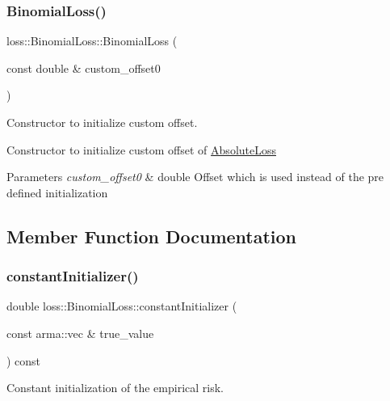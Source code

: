 \subsubsection{\texorpdfstring{Binomial\+Loss()}{BinomialLoss()}\hspace{0.1cm}{\footnotesize\ttfamily [2/2]}}
{\footnotesize\ttfamily loss\+::\+Binomial\+Loss\+::\+Binomial\+Loss (\begin{DoxyParamCaption}\item[{const double \&}]{custom\+\_\+offset0 }\end{DoxyParamCaption})}



Constructor to initialize custom offset. 

Constructor to initialize custom offset of {\ttfamily \mbox{\hyperlink{classloss_1_1_absolute_loss}{Absolute\+Loss}}}


\begin{DoxyParams}{Parameters}
{\em custom\+\_\+offset0} & {\ttfamily double} Offset which is used instead of the pre defined initialization \\
\hline
\end{DoxyParams}


\subsection{Member Function Documentation}
\mbox{\label{classloss_1_1_binomial_loss_a1292422a2b07c8ebe1b168375940b029}} 
\subsubsection{\texorpdfstring{constant\+Initializer()}{constantInitializer()}}
{\footnotesize\ttfamily double loss\+::\+Binomial\+Loss\+::constant\+Initializer (\begin{DoxyParamCaption}\item[{const arma\+::vec \&}]{true\+\_\+value }\end{DoxyParamCaption}) const\hspace{0.3cm}{\ttfamily [virtual]}}



Constant initialization of the empirical risk. 

